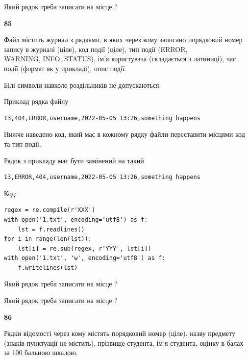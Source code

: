 Який рядок треба записати на місце  ?\par


\newpage

{\begin {center}\textbf{ 85}\end {center}}\par
Файл  містить журнал з рядками, в яких через кому записано поряд\-ко\-вий номер запису в журналі (ціле), код події (ціле), тип події (ERROR,\\ WARNING, INFO, STATUS), ім'я користувача (складається з латиниці), час події (фор\-мат як у прикладі), опис події.

Білі символи навколо роздільників не допускаються.

Приклад рядка файлу



\begin{verbatim}
13,404,ERROR,username,2022-05-05 13:26,something happens
\end{verbatim}


Нижче наведено код, який має в кожному рядку файли переставити місцями код та тип події.

Рядок з прикладу має бути замінений на такий



\begin{verbatim}
13,ERROR,404,username,2022-05-05 13:26,something happens
\end{verbatim}




Код:



\begin{verbatim}
regex = re.compile(r'XXX')
with open('1.txt', encoding='utf8') as f:
    lst = f.readlines()
for i in range(len(lst)):
    lst[i] = re.sub(regex, r'YYY', lst[i])
with open('1.txt', 'w', encoding='utf8') as f:
    f.writelines(lst)
\end{verbatim}







Який рядок треба записати на місце  ?\par
\vspace{5mm}


Який рядок треба записати на місце  ?\par


\newpage

{\begin {center}\textbf{ 86}\end {center}}\par
Рядки відомості через кому містять порядковий номер (ціле), назву предмету (зна\-ків пунктуації не містить), прізвище студента, ім'я студента, оцінку в балах за 100 бальною шкалою.

